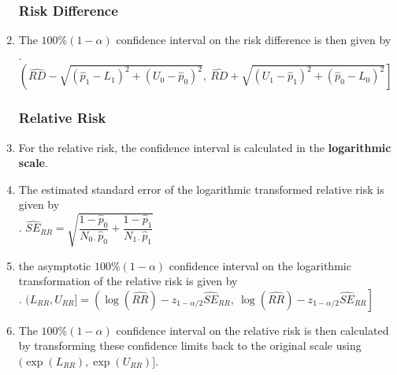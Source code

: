 \begin{enumerate}
\subsubsection{Risk Difference}

    \item The $100\%(1 - \alpha)$ confidence interval on the risk difference is then given by
    \hfill \cite{statistics/book/Statistics-for-Data-Scientists/Maurits-Kaptein}
    \\
    .\hfill
    $
        \left(
            \hat{R D} - \sqrt{(\hat{p}_1 - L_1)^2 + (U_0 - \hat{p}_0)^2},
            \ \hat{R D} + \sqrt{(U_1 - \hat{p}_1)^2 + (\hat{p}_0 - L_0)^2}
        \right]
    $
    \hfill \cite{statistics/book/Statistics-for-Data-Scientists/Maurits-Kaptein}

\subsubsection{Relative Risk}

    \item For the relative risk, the confidence interval is calculated in the \textbf{logarithmic scale}.
    \hfill \cite{statistics/book/Statistics-for-Data-Scientists/Maurits-Kaptein}

    \item The estimated standard error of the logarithmic transformed relative risk is given by 
    \hfill \cite{statistics/book/Statistics-for-Data-Scientists/Maurits-Kaptein}
    \\
    .\hfill
    $
        \hat{SE}_{RR} = \sqrt{
            \dfrac{1 - \hat{p}_0}{N_{0\cdot } \hat{p}_0}
            + \dfrac{1 - \hat{p}_1}{N_{1\cdot } \hat{p}_1}
        }
    $
    \hfill \cite{statistics/book/Statistics-for-Data-Scientists/Maurits-Kaptein}

    \item the asymptotic $100\%(1 - \alpha)$ confidence interval on the logarithmic transformation of the relative risk is given by
    \hfill \cite{statistics/book/Statistics-for-Data-Scientists/Maurits-Kaptein}
    \\
    .\hfill
    $
        (L_{R R} , U_{R R} ]
        = \left(
            \log( \hat{R R}) - z_{1-\alpha/2} \hat{S E}_{R R},
            \ \log( \hat{R R}) - z_{1-\alpha/2} \hat{S E}_{R R}
        \right]
    $
    \hfill \cite{statistics/book/Statistics-for-Data-Scientists/Maurits-Kaptein}

    \item The $100\%(1 - \alpha)$ confidence interval on the relative risk is then calculated by transforming these confidence limits back to the original scale using $(\exp(L_{R R} ), \exp(U_{R R })]$.
    \hfill \cite{statistics/book/Statistics-for-Data-Scientists/Maurits-Kaptein}


\end{enumerate}
